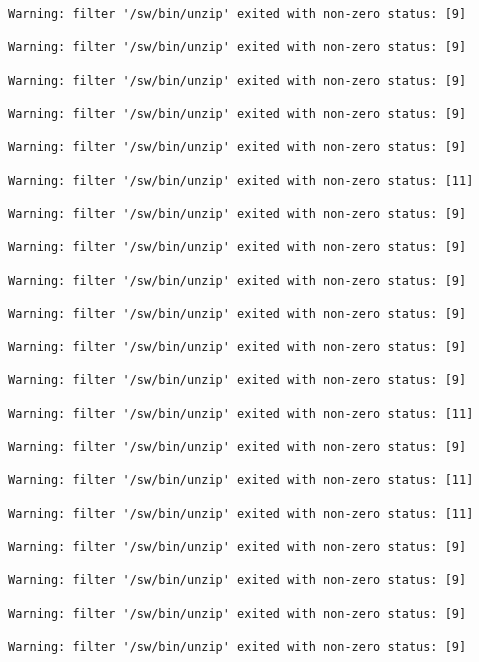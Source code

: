 \documentclass[11pt]{article}
\begin{document}
\begin{verbatim}
Warning: filter '/sw/bin/unzip' exited with non-zero status: [9]

Warning: filter '/sw/bin/unzip' exited with non-zero status: [9]

Warning: filter '/sw/bin/unzip' exited with non-zero status: [9]

Warning: filter '/sw/bin/unzip' exited with non-zero status: [9]

Warning: filter '/sw/bin/unzip' exited with non-zero status: [9]

Warning: filter '/sw/bin/unzip' exited with non-zero status: [11]

Warning: filter '/sw/bin/unzip' exited with non-zero status: [9]

Warning: filter '/sw/bin/unzip' exited with non-zero status: [9]

Warning: filter '/sw/bin/unzip' exited with non-zero status: [9]

Warning: filter '/sw/bin/unzip' exited with non-zero status: [9]

Warning: filter '/sw/bin/unzip' exited with non-zero status: [9]

Warning: filter '/sw/bin/unzip' exited with non-zero status: [9]

Warning: filter '/sw/bin/unzip' exited with non-zero status: [11]

Warning: filter '/sw/bin/unzip' exited with non-zero status: [9]

Warning: filter '/sw/bin/unzip' exited with non-zero status: [11]

Warning: filter '/sw/bin/unzip' exited with non-zero status: [11]

Warning: filter '/sw/bin/unzip' exited with non-zero status: [9]

Warning: filter '/sw/bin/unzip' exited with non-zero status: [9]

Warning: filter '/sw/bin/unzip' exited with non-zero status: [9]

Warning: filter '/sw/bin/unzip' exited with non-zero status: [9]


\end{verbatim}
\end{document}
